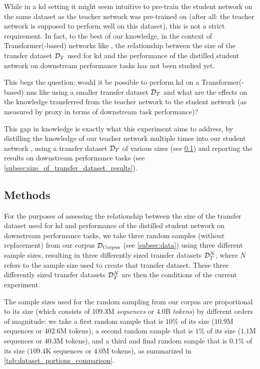 While in a \gls{kd} setting it might seem intuitive to pre-train the student network on the same dataset as the teacher network was pre-trained on (after all: the teacher network is supposed to perform well on this dataset), this is not a strict requirement. In fact, to the best of our knowledge, in the context of Transformer(-based) networks like \bertbase, the relationship between the size of the transfer dataset $\mathcal{D}_T$ used for \gls{kd} and the performance of the distilled student network on downstream performance tasks has not been studied yet.

This begs the question: would it be possible to perform \gls{kd} on a Transformer(-based) \glspl{nn} like \bertbase using a smaller transfer dataset $\mathcal{D}_T$ and what are the effects on the knowledge transferred from the teacher network to the student network (as measured by proxy in terms of downstream task performance)?

This gap in knowledge is exactly what this experiment aims to address, by distilling the knowledge of our teacher network \bertbase multiple times into our student network \bertstudent, using a transfer dataset $\mathcal{D}_T$ of various sizes (see \cref{subsec:size_of_transfer_dataset_methods}) and reporting the results on downstream performance tasks (see \cref{subsec:size_of_transfer_dataset_results}).



\subsection{Methods}
\label{subsec:size_of_transfer_dataset_methods}
For the purposes of assessing the relationship between the size of the transfer dataset used for \gls{kd} and performance of the distilled student network on downstream performance tasks, we take three random samples (without replacement) from our corpus $\mathcal{D}_\text{Corpus}$ (see \cref{subsec:data}) using three different sample sizes, resulting in three differently sized transfer datasets $\mathcal{D}_T^N$, where $N$ refers to the sample size used to create that transfer dataset. These three differently sized transfer datasets $\mathcal{D}_T^N$ are then the conditions of the current experiment.

The sample sizes used for the random sampling from our corpus are proportional to its size (which consists of $109.3$M \emph{sequences} or $4.0$B \emph{tokens}) by different orders of magnitude: we take a first random sample that is $10$\% of its size ($10.9$M sequences or $402.6$M tokens), a second random sample that is $1$\% of its size ($1.1$M sequences or $40.3$M tokens), and a third and final random sample that is $0.1$\% of its size ($109.4$K sequences or $4.0$M tokens), as summarized in \cref{tab:dataset_portions_comparison}.

